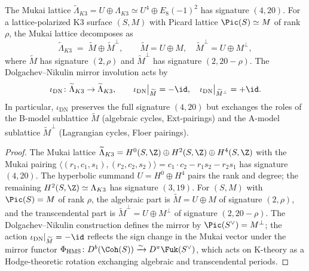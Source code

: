 \begin{proposition}
\label{prop:mukai-mirror-decomposition}
The Mukai lattice $\widetilde{\Lambda}_{K3} = U \oplus \Lambda_{K3} \simeq U^4 \oplus E_8(-1)^2$ has signature $(4,20)$. For a lattice-polarized K3 surface $(S, M)$ with Picard lattice $\Pic(S) \simeq M$ of rank $\rho$, the Mukai lattice decomposes as
\[
 \widetilde{\Lambda}_{K3} \;=\; \widetilde{M} \oplus \widetilde{M}^\perp, \qquad
 \widetilde{M} = U \oplus M, \quad
 \widetilde{M}^\perp = U \oplus M^\perp,
\]
where $\widetilde{M}$ has signature $(2, \rho)$ and $\widetilde{M}^\perp$ has signature $(2, 20-\rho)$. The Dolgachev--Nikulin mirror involution acts by
\[
 \iota_{\mathrm{DN}} \colon \widetilde{\Lambda}_{K3} \to \widetilde{\Lambda}_{K3}, \qquad
 \iota_{\mathrm{DN}}\big|_{\widetilde{M}} = -\id, \quad
 \iota_{\mathrm{DN}}\big|_{\widetilde{M}^\perp} = +\id.
\]
In particular, $\iota_{\mathrm{DN}}$ preserves the full signature $(4,20)$ but exchanges the roles of the B-model sublattice $\widetilde{M}$ (algebraic cycles, Ext-pairings) and the A-model sublattice $\widetilde{M}^\perp$ (Lagrangian cycles, Floer pairings).
\end{proposition}

\begin{proof}
The Mukai lattice $\widetilde{\Lambda}_{K3} = H^0(S,\Z) \oplus H^2(S,\Z) \oplus H^4(S,\Z)$ with the Mukai pairing $\langle (r_1, c_1, s_1), (r_2, c_2, s_2) \rangle = c_1 \cdot c_2 - r_1 s_2 - r_2 s_1$ has signature $(4,20)$. The hyperbolic summand $U = H^0 \oplus H^4$ pairs the rank and degree; the remaining $H^2(S,\Z) \simeq \Lambda_{K3}$ has signature $(3,19)$. For $(S,M)$ with $\Pic(S) = M$ of rank $\rho$, the algebraic part is $\widetilde{M} = U \oplus M$ of signature $(2,\rho)$, and the transcendental part is $\widetilde{M}^\perp = U \oplus M^\perp$ of signature $(2, 20-\rho)$. The Dolgachev--Nikulin construction defines the mirror by $\Pic(S^\vee) = M^\perp$; the action $\iota_{\mathrm{DN}}|_{\widetilde{M}} = -\id$ reflects the sign change in the Mukai vector under the mirror functor $\Phi_{\mathrm{HMS}} \colon D^b(\Coh(S)) \xrightarrow{\sim} D^\pi\Fuk(S^\vee)$, which acts on K-theory as a Hodge-theoretic rotation exchanging algebraic and transcendental periods.
\end{proof}

